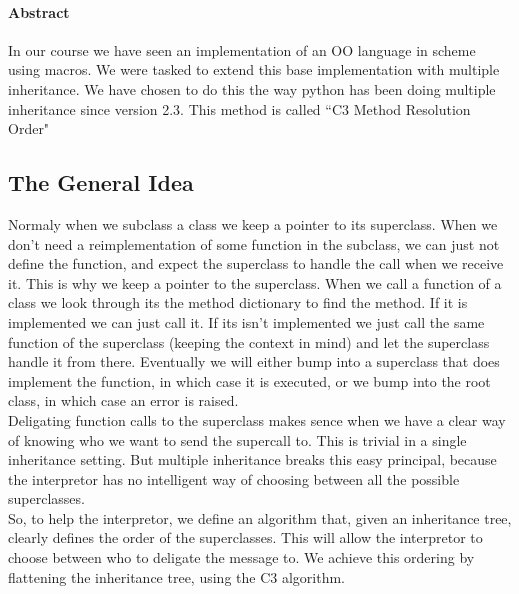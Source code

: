 \documentclass[10pt,a4paper]{scrartcl}
\begin{document}
\paragraph{Abstract}
In our course we have seen an implementation of an OO language in scheme using macros. We were tasked to extend this base implementation with multiple inheritance. We have chosen to do this the way python has been doing multiple inheritance since version 2.3. This method is called ``C3 Method Resolution Order"
\par
\endgroup
\begin{multicols}{2}
\section*{The General Idea}
Normaly when we subclass a class we keep a pointer to its superclass. When we don't need a reimplementation of some function in the subclass, we can just not define the function, and expect the superclass to handle the call when we receive it. This is why we keep a pointer to the superclass. When we call a function of a class we look through its the method dictionary to find the method. If it is implemented we can just call it. If its isn't implemented we just call the same function of the superclass (keeping the context in mind) and let the superclass handle it from there. Eventually we will either bump into a superclass that does implement the function, in which case it is executed, or we bump into the root class, in which case an error is raised.\\
Deligating function calls to the superclass makes sence when we have a clear way of knowing who we want to send the supercall to. This is trivial in a single inheritance setting. But multiple inheritance breaks this easy principal, because the interpretor has no intelligent way of choosing between all the possible superclasses.\\
So, to help the interpretor, we define an algorithm that, given an inheritance tree, clearly defines the order of the superclasses. This will allow the interpretor to choose between who to deligate the message to. We achieve this ordering by flattening the inheritance tree, using the C3 algorithm.\\

\end{multicols}
\end{document}
